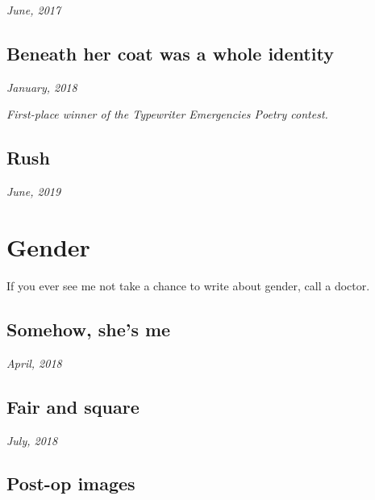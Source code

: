 \documentclass[10pt]{memoir}
\begin{document}
  \hfill\textit{June, 2017}

  
  \newpage


  \section{Beneath her coat was a whole identity}

  \hfill\textit{January, 2018}

  

  \textit{First-place winner of the Typewriter Emergencies Poetry contest.}
  \newpage


  \section{Rush}

  \hfill\textit{June, 2019}

  
  \newpage


  \chapter{Gender}

  If you ever see me not take a chance to write about gender, call a doctor.

  \newpage

  \section{Somehow, she's me}

  \hfill\textit{April, 2018}

  
  \newpage


  \section{Fair and square}

  \hfill\textit{July, 2018}

  
  \newpage


  \section{Post-op images}
\end{document}
